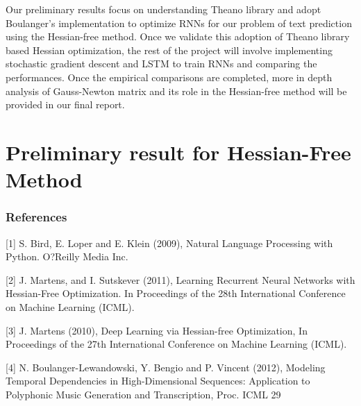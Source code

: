 \documentclass{article} %
\begin{document}
Our preliminary results focus on understanding Theano library and adopt Boulanger's implementation to optimize RNNs for our problem of text prediction using the Hessian-free method. Once we validate this adoption of Theano library based Hessian optimization, the rest of the project will involve implementing stochastic gradient descent and LSTM to train RNNs and comparing the performances. Once the empirical comparisons are completed, more in depth analysis of Gauss-Newton matrix and its role in the Hessian-free method will be provided in our final report.

\section{Preliminary result for Hessian-Free Method}


\subsubsection*{References}


\small{
[1] S. Bird, E. Loper and E. Klein (2009), Natural Language Processing with Python. O?Reilly Media Inc.

[2] J. Martens, and I. Sutskever (2011), Learning Recurrent Neural Networks with Hessian-Free Optimization. In Proceedings of the 28th International Conference on Machine Learning (ICML).

[3] J. Martens (2010), Deep Learning via Hessian-free Optimization, In Proceedings of the 27th International Conference on Machine Learning (ICML).

[4] N. Boulanger-Lewandowski, Y. Bengio and P. Vincent (2012), Modeling Temporal Dependencies in High-Dimensional Sequences: Application to Polyphonic Music Generation and Transcription, Proc. ICML 29
}
\end{document}
